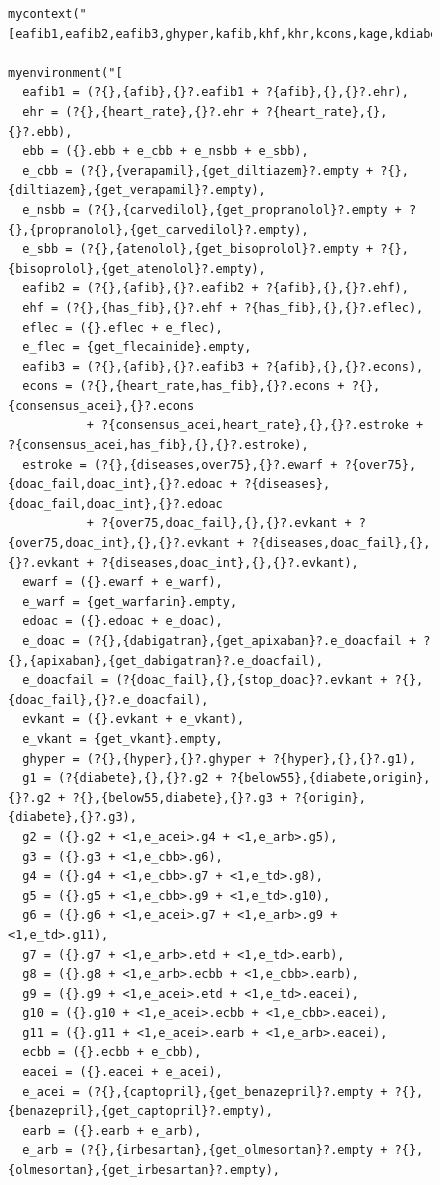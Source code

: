\begin{figure}[t]
\begin{verbatim}
mycontext("[eafib1,eafib2,eafib3,ghyper,kafib,khf,khr,kcons,kage,kdiabete,kdoacint,khyper,korigin,k_doac]").

myenvironment("[
  eafib1 = (?{},{afib},{}?.eafib1 + ?{afib},{},{}?.ehr),
  ehr = (?{},{heart_rate},{}?.ehr + ?{heart_rate},{},{}?.ebb),
  ebb = ({}.ebb + e_cbb + e_nsbb + e_sbb),
  e_cbb = (?{},{verapamil},{get_diltiazem}?.empty + ?{},{diltiazem},{get_verapamil}?.empty),
  e_nsbb = (?{},{carvedilol},{get_propranolol}?.empty + ?{},{propranolol},{get_carvedilol}?.empty),
  e_sbb = (?{},{atenolol},{get_bisoprolol}?.empty + ?{},{bisoprolol},{get_atenolol}?.empty),
  eafib2 = (?{},{afib},{}?.eafib2 + ?{afib},{},{}?.ehf),
  ehf = (?{},{has_fib},{}?.ehf + ?{has_fib},{},{}?.eflec),
  eflec = ({}.eflec + e_flec),
  e_flec = {get_flecainide}.empty,
  eafib3 = (?{},{afib},{}?.eafib3 + ?{afib},{},{}?.econs),
  econs = (?{},{heart_rate,has_fib},{}?.econs + ?{},{consensus_acei},{}?.econs 
           + ?{consensus_acei,heart_rate},{},{}?.estroke + ?{consensus_acei,has_fib},{},{}?.estroke),
  estroke = (?{},{diseases,over75},{}?.ewarf + ?{over75},{doac_fail,doac_int},{}?.edoac + ?{diseases},{doac_fail,doac_int},{}?.edoac 
           + ?{over75,doac_fail},{},{}?.evkant + ?{over75,doac_int},{},{}?.evkant + ?{diseases,doac_fail},{},{}?.evkant + ?{diseases,doac_int},{},{}?.evkant),
  ewarf = ({}.ewarf + e_warf),
  e_warf = {get_warfarin}.empty,
  edoac = ({}.edoac + e_doac),
  e_doac = (?{},{dabigatran},{get_apixaban}?.e_doacfail + ?{},{apixaban},{get_dabigatran}?.e_doacfail),
  e_doacfail = (?{doac_fail},{},{stop_doac}?.evkant + ?{},{doac_fail},{}?.e_doacfail),
  evkant = ({}.evkant + e_vkant),
  e_vkant = {get_vkant}.empty,	
  ghyper = (?{},{hyper},{}?.ghyper + ?{hyper},{},{}?.g1),
  g1 = (?{diabete},{},{}?.g2 + ?{below55},{diabete,origin},{}?.g2 + ?{},{below55,diabete},{}?.g3 + ?{origin},{diabete},{}?.g3),
  g2 = ({}.g2 + <1,e_acei>.g4 + <1,e_arb>.g5),
  g3 = ({}.g3 + <1,e_cbb>.g6),
  g4 = ({}.g4 + <1,e_cbb>.g7 + <1,e_td>.g8),
  g5 = ({}.g5 + <1,e_cbb>.g9 + <1,e_td>.g10),
  g6 = ({}.g6 + <1,e_acei>.g7 + <1,e_arb>.g9 + <1,e_td>.g11),
  g7 = ({}.g7 + <1,e_arb>.etd + <1,e_td>.earb),
  g8 = ({}.g8 + <1,e_arb>.ecbb + <1,e_cbb>.earb),
  g9 = ({}.g9 + <1,e_acei>.etd + <1,e_td>.eacei),
  g10 = ({}.g10 + <1,e_acei>.ecbb + <1,e_cbb>.eacei),
  g11 = ({}.g11 + <1,e_acei>.earb + <1,e_arb>.eacei),
  ecbb = ({}.ecbb + e_cbb),
  eacei = ({}.eacei + e_acei),
  e_acei = (?{},{captopril},{get_benazepril}?.empty + ?{},{benazepril},{get_captopril}?.empty),
  earb = ({}.earb + e_arb),
  e_arb = (?{},{irbesartan},{get_olmesortan}?.empty + ?{},{olmesortan},{get_irbesartan}?.empty),

\end{verbatim}
\end{figure}
